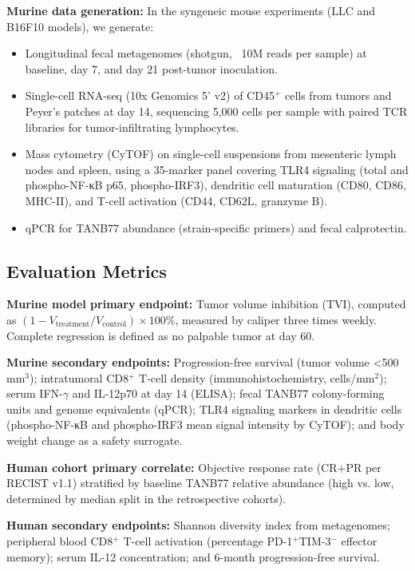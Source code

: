 \documentclass{article}
\begin{document}
\textbf{Murine data generation:} In the syngeneic mouse experiments (LLC and B16F10 models), we generate:
\begin{itemize}
    \item Longitudinal fecal metagenomes (shotgun, ~10M reads per sample) at baseline, day 7, and day 21 post-tumor inoculation.
    \item Single-cell RNA-seq (10x Genomics 5' v2) of CD45$^+$ cells from tumors and Peyer's patches at day 14, sequencing 5,000 cells per sample with paired TCR libraries for tumor-infiltrating lymphocytes.
    \item Mass cytometry (CyTOF) on single-cell suspensions from mesenteric lymph nodes and spleen, using a 35-marker panel covering TLR4 signaling (total and phospho-NF-κB p65, phospho-IRF3), dendritic cell maturation (CD80, CD86, MHC-II), and T-cell activation (CD44, CD62L, granzyme B).
    \item qPCR for TANB77 abundance (strain-specific primers) and fecal calprotectin.
\end{itemize}

\subsection{Evaluation Metrics}
\textbf{Murine model primary endpoint:} Tumor volume inhibition (TVI), computed as $(1 - V_{\text{treatment}}/V_{\text{control}}) \times 100\%$, measured by caliper three times weekly. Complete regression is defined as no palpable tumor at day 60.

\textbf{Murine secondary endpoints:} Progression-free survival (tumor volume <500 mm$^3$); intratumoral CD8$^+$ T-cell density (immunohistochemistry, cells/mm$^2$); serum IFN-$\gamma$ and IL-12p70 at day 14 (ELISA); fecal TANB77 colony-forming units and genome equivalents (qPCR); TLR4 signaling markers in dendritic cells (phospho-NF-κB and phospho-IRF3 mean signal intensity by CyTOF); and body weight change as a safety surrogate.

\textbf{Human cohort primary correlate:} Objective response rate (CR+PR per RECIST v1.1) stratified by baseline TANB77 relative abundance (high vs. low, determined by median split in the retrospective cohorts).

\textbf{Human secondary endpoints:} Shannon diversity index from metagenomes; peripheral blood CD8$^+$ T-cell activation (percentage PD-1$^+$TIM-3$^-$ effector memory); serum IL-12 concentration; and 6-month progression-free survival.
\end{document}
